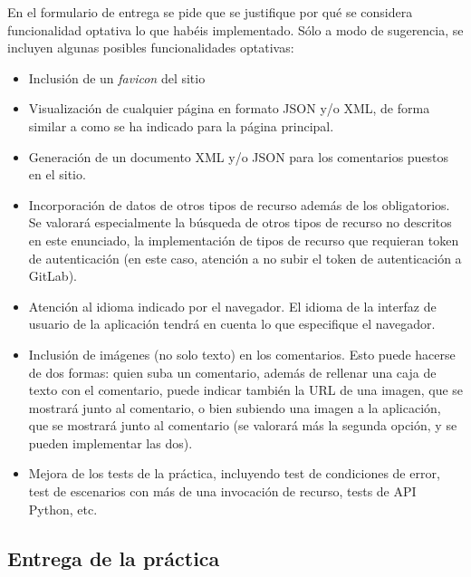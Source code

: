 En el formulario de entrega se pide que se justifique por qué se considera funcionalidad optativa lo que habéis implementado. Sólo a modo de sugerencia, se incluyen algunas posibles funcionalidades optativas:

\begin{itemize}
  \item Inclusión de un \emph{favicon} del sitio
  
  \item Visualización de cualquier página en formato JSON y/o XML, de forma similar a como se ha indicado para la página principal.

  \item Generación de un documento XML y/o JSON para los comentarios puestos en el sitio.

  \item Incorporación de datos de otros tipos de recurso además de los obligatorios. Se valorará especialmente la búsqueda de otros tipos de recurso no descritos en este enunciado, la implementación de tipos de recurso que requieran token de autenticación (en este caso, atención a no subir el token de autenticación a GitLab).
 
  \item Atención al idioma indicado por el navegador. El idioma de la interfaz de usuario de la aplicación tendrá en cuenta lo que especifique el navegador.

  \item Inclusión de imágenes (no solo texto) en los comentarios. Esto puede hacerse de dos formas: quien suba un comentario, además de rellenar una caja de texto con el comentario, puede indicar también la URL de una imagen, que se mostrará junto al comentario, o bien subiendo una imagen a la aplicación, que se mostrará junto al comentario (se valorará más la segunda opción, y se pueden implementar las dos).
    
  \item Mejora de los tests de la práctica, incluyendo test de condiciones de error, test de escenarios con más de una invocación de recurso, tests de API Python, etc.
\end{itemize}

\subsection{Entrega de la práctica}

